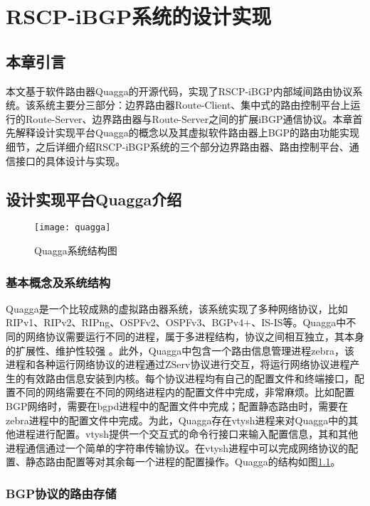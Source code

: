 \chapter{RSCP-iBGP系统的设计实现}
\label{cha:design}

\section{本章引言}
本文基于软件路由器Quagga\cite{quagga}的开源代码，实现了RSCP-iBGP内部域间路由协议系统。该系统主要分三部分：边界路由器Route-Client、集中式的路由控制平台上运行的Route-Server、边界路由器与Route-Server之间的扩展iBGP通信协议。本章首先解释设计实现平台Quagga的概念以及其虚拟软件路由器上BGP的路由功能实现细节，之后详细介绍RSCP-iBGP系统的三个部分边界路由器、路由控制平台、通信接口的具体设计与实现。

\section{设计实现平台Quagga介绍}

\begin{figure}
  \centering
  \texttt{[image: quagga]}
  \caption{Quagga系统结构图\cite{jakma2014quagga}}
  \label{fig:quagga}
\end{figure}


\subsection{基本概念及系统结构}
Quagga是一个比较成熟的虚拟路由器系统，该系统实现了多种网络协议，比如RIPv1、RIPv2、RIPng、OSPFv2、OSPFv3、BGPv4+、IS-IS等。Quagga中不同的网络协议需要运行不同的进程，属于多进程结构，协议之间相互独立，其本身的扩展性、维护性较强 \cite{quaggaThesis}。此外，Quagga中包含一个路由信息管理进程zebra，该进程和各种运行网络协议的进程通过ZServ协议进行交互，将运行网络协议进程产生的有效路由信息安装到内核\cite{jakma2014quagga}。每个协议进程均有自己的配置文件和终端接口，配置不同的网络需要在不同的网络进程内的配置文件中完成，非常麻烦。比如配置BGP网络时，需要在bgpd进程中的配置文件中完成；配置静态路由时，需要在zebra进程中的配置文件中完成。为此，Quagga存在vtysh进程来对Quagga中的其他进程进行配置。vtysh提供一个交互式的命令行接口来输入配置信息，其和其他进程通信通过一个简单的字符串传输协议。在vtysh进程中可以完成网络协议的配置、静态路由配置等对其余每一个进程的配置操作。Quagga的结构如图\ref{fig:quagga}。
\subsection{BGP协议的路由存储}

